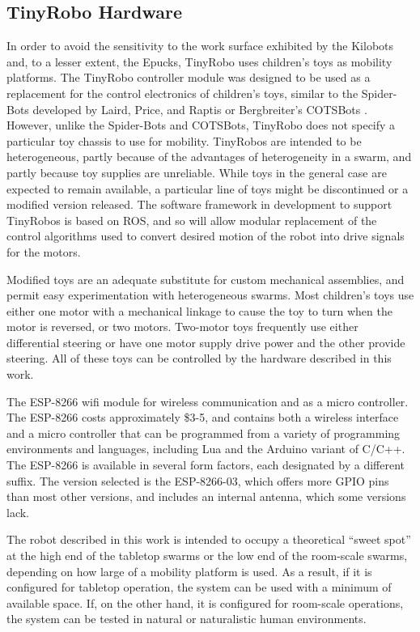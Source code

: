 \documentclass[letterpaper, 10 pt, conference]{ieeeconf}  %
\begin{document}
\subsection{TinyRobo Hardware}

In order to avoid the sensitivity to the work surface exhibited by the Kilobots and, to a lesser extent, the Epucks, TinyRobo uses children's toys as mobility platforms. 
The TinyRobo controller module was designed to be used as a replacement for the control electronics of children's toys, similar to the Spider-Bots developed by Laird, Price, and Raptis or Bergbreiter's COTSBots \cite{lairdspider, bergbreiter2003cotsbots}.
However, unlike the Spider-Bots and COTSBots, TinyRobo does not specify a particular toy chassis to use for mobility. 
TinyRobos are intended to be heterogeneous, partly because of the advantages of heterogeneity in a swarm, and partly because toy supplies are unreliable.
While toys in the general case are expected to remain available, a particular line of toys might be discontinued or a modified version released. 
The software framework in development to support TinyRobos is based on ROS, and so will allow modular replacement of the control algorithms used to convert desired motion of the robot into drive signals for the motors. 

Modified toys are an adequate substitute for custom mechanical assemblies, and permit easy experimentation with heterogeneous swarms. 
Most children's toys use either one motor with a mechanical linkage to cause the toy to turn when the motor is reversed, or two motors.
Two-motor toys frequently use either differential steering or have one motor supply drive power and the other provide steering. 
All of these toys can be controlled by the hardware described in this work.

 The ESP-8266 wifi module for wireless communication and as a micro controller. 
The ESP-8266 costs approximately \$3-5, and contains both a wireless interface and a micro controller that can be programmed from a variety of programming environments and languages, including Lua and the Arduino variant of C/C++.   
The ESP-8266 is available in several form factors, each designated by a different suffix. 
The version selected is the ESP-8266-03, which offers more GPIO pins than most other versions, and includes an internal antenna, which some versions lack. 

The robot described in this work is intended to occupy a theoretical ``sweet spot'' at the high end of the tabletop swarms or the low end of the room-scale swarms, depending on how large of a mobility platform is used. 
As a result, if it is configured for tabletop operation, the system can be used with a minimum of available space. 
If, on the other hand, it is configured for room-scale operations, the system can be tested in natural or naturalistic human environments. 




\end{document}
